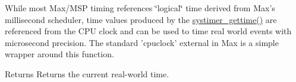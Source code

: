 While most Max/MSP timing references \char`\"{}logical\char`\"{} time derived from Max's millisecond scheduler, time values produced by the \hyperlink{group__clocks_ga11fd7e2733b0186ff82e9766db3031e7}{systimer\_\-gettime()} are referenced from the CPU clock and can be used to time real world events with microsecond precision. The standard 'cpuclock' external in Max is a simple wrapper around this function.

\begin{DoxyReturn}{Returns}
Returns the current real-\/world time. 
\end{DoxyReturn}
